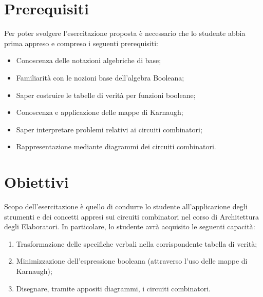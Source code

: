 \section{Prerequisiti}
Per poter svolgere l'esercitazione proposta è necessario che lo studente abbia prima appreso e compreso i seguenti prerequisiti: 

\begin{itemize}
    \item Conoscenza delle notazioni algebriche di base; 
    \item Familiarità con le nozioni base dell'algebra Booleana; 
    \item Saper costruire le tabelle di verità per funzioni booleane;
    \item Conoscenza e applicazione delle mappe di Karnaugh; 
	\item Saper interpretare problemi relativi ai circuiti combinatori; 
    \item Rappresentazione mediante diagrammi dei circuiti combinatori. 
\end{itemize}

\section{Obiettivi}
Scopo dell'esercitazione è quello di condurre lo studente all'applicazione degli strumenti e dei concetti appresi sui circuiti combinatori nel corso di Architettura degli Elaboratori. In particolare, lo studente avrà acquisito le seguenti capacità: 
\begin{enumerate}
    \item Trasformazione delle specifiche verbali nella corrispondente tabella di verità; 
    \item Minimizzazione dell'espressione booleana (attraverso l'uso delle mappe di Karnaugh); 
    \item Disegnare, tramite appositi diagrammi, i circuiti combinatori. 
    
\end{enumerate}
